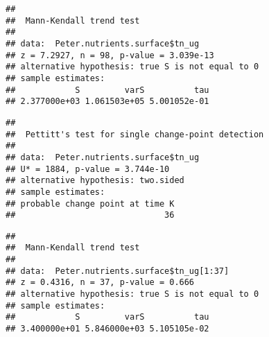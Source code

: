 \documentclass[]{article}
\newenvironment{Shaded}{\begin{snugshade}}{\end{snugshade}}
\newcommand{\KeywordTok}[1]{\textcolor[rgb]{0.13,0.29,0.53}{\textbf{#1}}}
\newcommand{\DecValTok}[1]{\textcolor[rgb]{0.00,0.00,0.81}{#1}}
\newcommand{\StringTok}[1]{\textcolor[rgb]{0.31,0.60,0.02}{#1}}
\newcommand{\CommentTok}[1]{\textcolor[rgb]{0.56,0.35,0.01}{\textit{#1}}}
\newcommand{\OperatorTok}[1]{\textcolor[rgb]{0.81,0.36,0.00}{\textbf{#1}}}
\newcommand{\NormalTok}[1]{#1}
\begin{document}
\begin{Shaded}
\end{Shaded}

\begin{verbatim}
## 
##  Mann-Kendall trend test
## 
## data:  Peter.nutrients.surface$tn_ug
## z = 7.2927, n = 98, p-value = 3.039e-13
## alternative hypothesis: true S is not equal to 0
## sample estimates:
##            S         varS          tau 
## 2.377000e+03 1.061503e+05 5.001052e-01
\end{verbatim}

\begin{Shaded}
\end{Shaded}

\begin{verbatim}
## 
##  Pettitt's test for single change-point detection
## 
## data:  Peter.nutrients.surface$tn_ug
## U* = 1884, p-value = 3.744e-10
## alternative hypothesis: two.sided
## sample estimates:
## probable change point at time K 
##                              36
\end{verbatim}

\begin{Shaded}
\end{Shaded}

\begin{verbatim}
## 
##  Mann-Kendall trend test
## 
## data:  Peter.nutrients.surface$tn_ug[1:37]
## z = 0.4316, n = 37, p-value = 0.666
## alternative hypothesis: true S is not equal to 0
## sample estimates:
##            S         varS          tau 
## 3.400000e+01 5.846000e+03 5.105105e-02
\end{verbatim}
\end{document}
